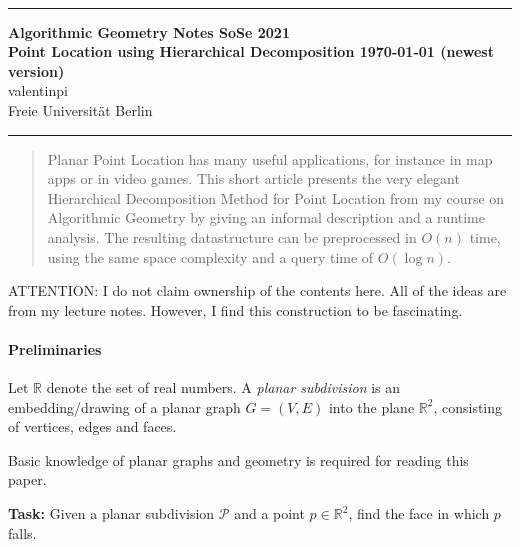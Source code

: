 \documentclass[10pt]{article}
\theoremstyle{definition}
\theoremstyle{remark}
\newcommand{\Authors}{valentinpi}
\begin{document}
\vspace*{-12ex}
\phantom{}\\
\noindent\rule{\textwidth}{0.1pt}
\large \textbf{Algorithmic Geometry Notes \hfill SoSe 2021} \vspace*{0.25cm}\\
\normalsize \textbf{Point Location using Hierarchical Decomposition \hfill \today { (newest version)}}\\
\Authors\\
Freie Universität Berlin\\
\noindent\rule{\textwidth}{0.1pt}

\begin{abstract}
    \noindent Planar Point Location has many useful applications, for instance in map apps or in video games. This short article presents the very elegant Hierarchical Decomposition Method for Point Location from my course on Algorithmic Geometry by giving an informal description and a runtime analysis. The resulting datastructure can be preprocessed in \(O(n)\) time, using the same space complexity and a query time of \(O(\log{n})\).
\end{abstract}

\vspace{\baselineskip}

ATTENTION: I do not claim ownership of the contents here. All of the ideas are from my lecture notes. However, I find this construction to be fascinating.

\paragraph{Preliminaries} Let \(\mathbb{R}\) denote the set of real numbers. A \emph{planar subdivision} is an embedding/drawing of a planar graph \(G = (V, E)\) into the plane \(\mathbb{R}^2\), consisting of vertices, edges and faces.

Basic knowledge of planar graphs and geometry is required for reading this paper.

\vspace{\baselineskip}

\textbf{Task:} Given a planar subdivision \(\mathcal{P}\) and a point \(p \in \mathbb{R}^2\), find the face in which \(p\) falls.
\end{document}
